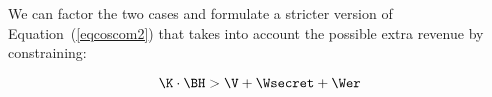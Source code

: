 We can factor the two cases and formulate a stricter version of Equation~(\ref{eqcoscom2}) that takes into account the possible extra revenue by constraining:


\begin{equation}\label{eqcoscom2w}
\K \cdot \BH > \V + \Wsecret + \Wer
\end{equation}












%
%

